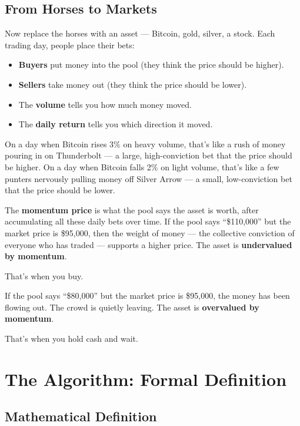 \documentclass[11pt,a4paper]{article}
\begin{document}
\subsection{From Horses to Markets}

Now replace the horses with an asset --- Bitcoin, gold, silver, a
stock. Each trading day, people place their bets:

\begin{itemize}[leftmargin=2em]
    \item \textbf{Buyers} put money into the pool (they think the price
          should be higher).
    \item \textbf{Sellers} take money out (they think the price should
          be lower).
    \item The \textbf{volume} tells you how much money moved.
    \item The \textbf{daily return} tells you which direction it moved.
\end{itemize}

On a day when Bitcoin rises 3\% on heavy volume, that's like a rush
of money pouring in on Thunderbolt --- a large, high-conviction bet
that the price should be higher. On a day when Bitcoin falls 2\% on
light volume, that's like a few punters nervously pulling money off
Silver Arrow --- a small, low-conviction bet that the price should
be lower.

The \textbf{momentum price} is what the pool says the asset is worth,
after accumulating all these daily bets over time. If the pool says
``\$110,000'' but the market price is \$95,000, then the weight of
money --- the collective conviction of everyone who has traded ---
supports a higher price. The asset is \textbf{undervalued by momentum}.

That's when you buy.

If the pool says ``\$80,000'' but the market price is \$95,000, the
money has been flowing out. The crowd is quietly leaving. The asset is
\textbf{overvalued by momentum}.

That's when you hold cash and wait.

\section{The Algorithm: Formal Definition}

\subsection{Mathematical Definition}
\end{document}
